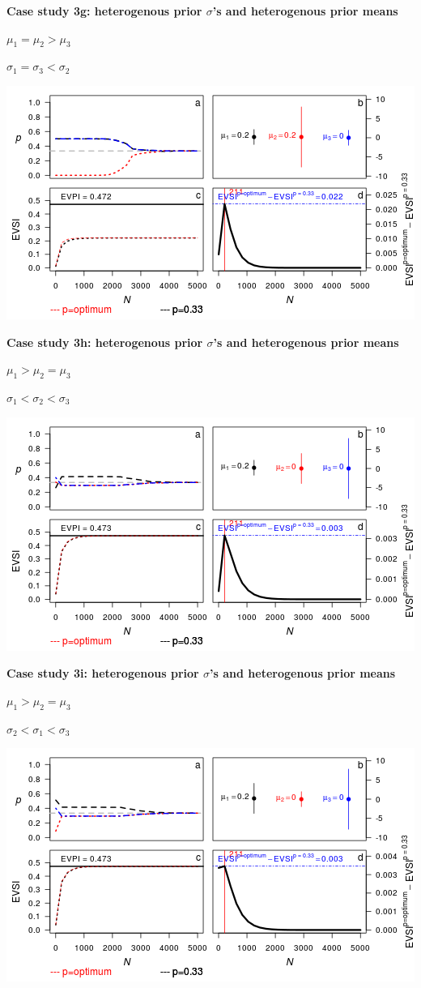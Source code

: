 \documentclass[]{article}
\theoremstyle{definition}
\theoremstyle{definition}
\theoremstyle{remark}
\begin{document}
\textbf{Case study 3g: heterogenous prior \(\sigma\)'s and heterogenous
prior means}

\(\mu_1 = \mu_2 > \mu_3\)

\(\sigma_1 = \sigma_3 < \sigma_2\)

\includegraphics{figure/x110_1__1_1c-1.png} \clearpage

\textbf{Case study 3h: heterogenous prior \(\sigma\)'s and heterogenous
prior means}

\(\mu_1 > \mu_2 = \mu_3\)

\(\sigma_1 < \sigma_2 < \sigma_3\)

\includegraphics{figure/x100_1__1___1c-1.png} \clearpage  

\textbf{Case study 3i: heterogenous prior \(\sigma\)'s and heterogenous
prior means}

\(\mu_1 > \mu_2 = \mu_3\)

\(\sigma_2 < \sigma_1 < \sigma_3\)

\includegraphics{figure/x100__1_1___1c-1.png} \clearpage
\end{document}
